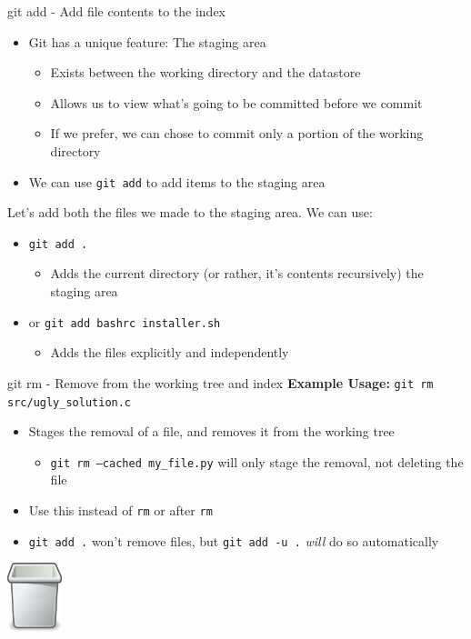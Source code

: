 \documentclass[aspectratio=43]{beamer}
\begin{document}
\begin{frame}{git add - Add file contents to the index}
    \begin{itemize}
    \item Git has a unique feature: The staging area
        \begin{itemize}
        \item Exists between the working directory and the datastore
        \item Allows us to view what's going to be committed before we commit
        \item If we prefer, we can chose to commit only a portion of the working
            directory
        \end{itemize}
    \item We can use \texttt{git add} to add items to the staging area
    \end{itemize}

    Let's add both the files we made to the staging area. We can use:
    \begin{itemize}
    \item \texttt{git add .}
        \begin{itemize}
        \item Adds the current directory (or rather, it's contents recursively)
              the staging area
        \end{itemize}
    \item or \texttt{git add bashrc installer.sh}
        \begin{itemize}
        \item Adds the files explicitly and independently
        \end{itemize}
    \end{itemize}
\end{frame}

\begin{frame}{git rm - Remove from the working tree and index}
    \textbf{Example Usage:} \texttt{git rm src/ugly\_solution.c}
    \begin{itemize}
    \item Stages the removal of a file, and removes it from the working tree
        \begin{itemize}
        \item \texttt{git rm --cached my\_file.py} will only stage the removal,
            not deleting the file
        \end{itemize}
    \item Use this instead of \texttt{rm} or after \texttt{rm}
    \item \texttt{git add .} won't remove files, but \texttt{git add -u .}
        \textit{will} do so automatically
    \end{itemize}
    \begin{flushright}
        \includegraphics[height=2cm]{resources/white_trash.png}
    \end{flushright}
\end{frame}
\end{document}
